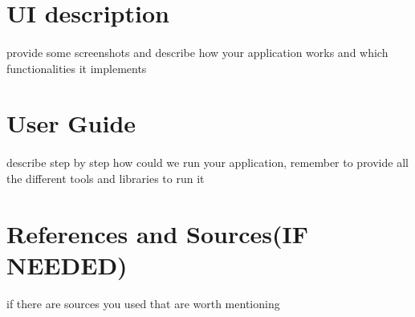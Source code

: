 \documentclass[a4paper,12pt]{article}
\begin{document}
\section{UI description}
\paragraph{}provide some screenshots and describe how your application works and which functionalities it implements
\section{User Guide} 
\paragraph{} describe step by step how could we run your application, remember to provide all the different tools and libraries to run it
\section{References and Sources(IF NEEDED)}
\paragraph{}if there are sources you used that are worth mentioning
\end{document}
